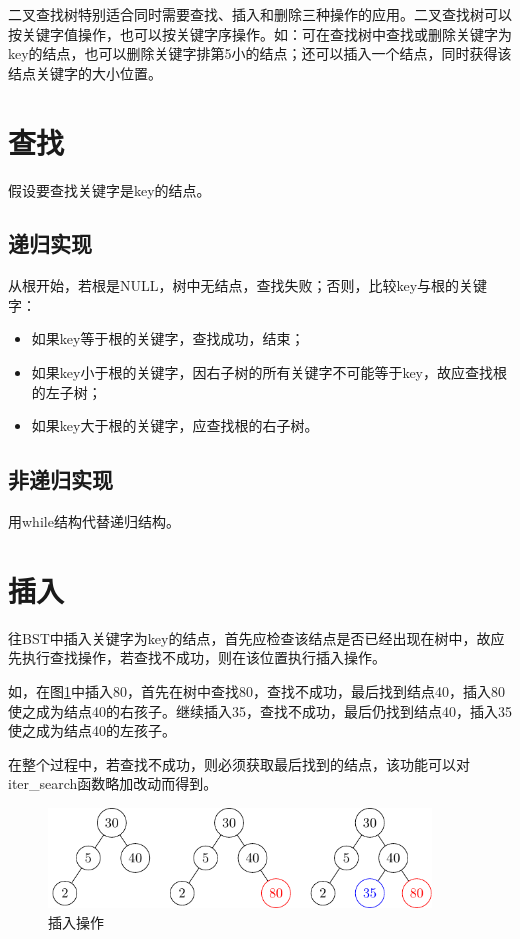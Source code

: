 \documentclass[10pt]{article}
\begin{document}
\begin{zhu}
二叉查找树特别适合同时需要查找、插入和删除三种操作的应用。二叉查找树可以按关键字值操作，也可以按关键字序操作。如：可在查找树中查找或删除关键字为key的结点，也可以删除关键字排第5小的结点；还可以插入一个结点，同时获得该结点关键字的大小位置。
\end{zhu}



\section{查找}
假设要查找关键字是key的结点。

\subsection{递归实现}
从根开始，若根是NULL，树中无结点，查找失败；否则，比较key与根的关键字：
\begin{itemize}
\item 如果key等于根的关键字，查找成功，结束；
\item 如果key小于根的关键字，因右子树的所有关键字不可能等于key，故应查找根的左子树；
\item 如果key大于根的关键字，应查找根的右子树。
\end{itemize}



\subsection{非递归实现}
用while结构代替递归结构。



\section{插入}
往BST中插入关键字为key的结点，首先应检查该结点是否已经出现在树中，故应先执行查找操作，若查找不成功，则在该位置执行插入操作。

如，在图\ref{insert}中插入80，首先在树中查找80，查找不成功，最后找到结点40，插入80使之成为结点40的右孩子。继续插入35，查找不成功，最后仍找到结点40，插入35使之成为结点40的左孩子。

在整个过程中，若查找不成功，则必须获取最后找到的结点，该功能可以对iter\_search函数略加改动而得到。
\begin{figure}[htbp]
\centering
\includegraphics[width=4in]{TIKZ/bst/bst_insert.pdf}  
\caption{插入操作}\label{insert}
\end{figure}
\end{document}
